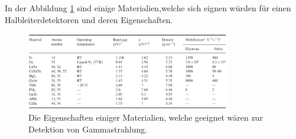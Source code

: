 In der Abbildung \ref{fig:halbleitermatrialien} sind einige Materialien,welche sich eignen würden für einen Halbleiterdetektoren und deren Eigenschaften.

\begin{figure}[H]
    \centering
    \includegraphics[width=0.8\textwidth]{content/grafik/passende.jpg}
    \caption{Die Eigenschaften einiger Materialien, welche geeignet wären zur Detektion von Gammastrahlung.\cite{gamma_ray}}
    \label{fig:halbleitermatrialien}
\end{figure}